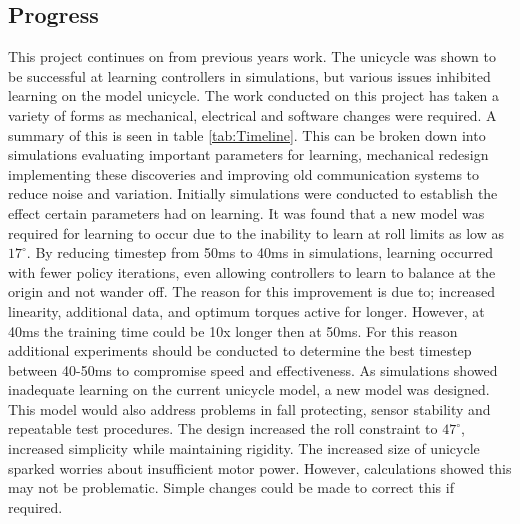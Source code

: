 \documentclass[twoside,twocolumn,12pt]{article}
\begin{document}
\twocolumn
{}%


\subsection{Progress}
This project continues on from previous years work. The unicycle was shown to be successful at learning controllers in simulations, but various issues inhibited learning on the model unicycle.   
\newline
The work conducted on this project has taken a variety of forms as mechanical, electrical and software changes were required. A summary of this is seen in table \ref{tab:Timeline}. This can be broken down into simulations evaluating important parameters for learning, mechanical redesign implementing these discoveries and improving old communication systems to reduce noise and variation.
\newline
Initially simulations were conducted to establish the effect certain parameters had on learning. It was found that a new model was required for learning to occur due to the inability to learn at roll limits as low as $17^{\circ}$. By reducing timestep from 50ms to 40ms in simulations, learning occurred with fewer policy iterations, even allowing controllers to learn to balance at the origin and not wander off. The reason for this improvement is due to; increased linearity, additional data, and optimum torques active for longer. However, at 40ms the training time could be 10x longer then at 50ms. For this reason additional experiments should be conducted to determine the best timestep between 40-50ms to compromise speed and effectiveness. 
\newline
As simulations showed inadequate learning on the current unicycle model, a new model was designed. This model would also address problems in fall protecting, sensor stability and repeatable test procedures. The design increased the roll constraint to $47^{\circ}$, increased simplicity while maintaining rigidity. The increased size of unicycle sparked worries about insufficient motor power. However, calculations showed this may not be problematic. Simple changes could be made to correct this if required.   
\end{document}
